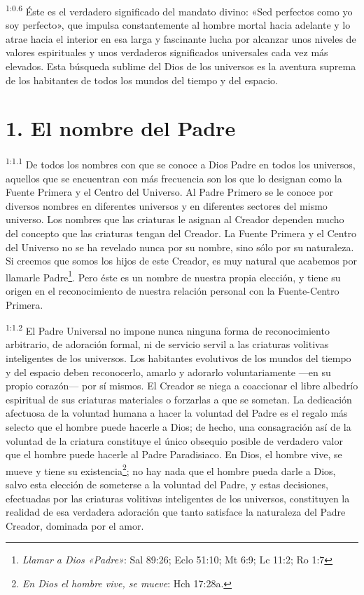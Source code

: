 \par
\textsuperscript{1:0.6} Éste es el verdadero significado del mandato divino: «Sed perfectos como yo soy perfecto», que impulsa constantemente al hombre mortal hacia adelante y lo atrae hacia el interior en esa larga y fascinante lucha por alcanzar unos niveles de valores espirituales y unos verdaderos significados universales cada vez más elevados. Esta búsqueda sublime del Dios de los universos es la aventura suprema de los habitantes de todos los mundos del tiempo y del espacio.

\section*{1. El nombre del Padre}
\par
\textsuperscript{1:1.1} De todos los nombres con que se conoce a Dios Padre en todos los universos, aquellos que se encuentran con más frecuencia son los que lo designan como la Fuente Primera y el Centro del Universo. Al Padre Primero se le conoce por diversos nombres en diferentes universos y en diferentes sectores del mismo universo. Los nombres que las criaturas le asignan al Creador dependen mucho del concepto que las criaturas tengan del Creador. La Fuente Primera y el Centro del Universo no se ha revelado nunca por su nombre, sino sólo por su naturaleza. Si creemos que somos los hijos de este Creador, es muy natural que acabemos por llamarle Padre\footnote{\textit{Llamar a Dios «Padre»}: Sal 89:26; Eclo 51:10; Mt 6:9; Lc 11:2; Ro 1:7}. Pero éste es un nombre de nuestra propia elección, y tiene su origen en el reconocimiento de nuestra relación personal con la Fuente-Centro Primera.

\par
\textsuperscript{1:1.2} El Padre Universal no impone nunca ninguna forma de reconocimiento arbitrario, de adoración formal, ni de servicio servil a las criaturas volitivas inteligentes de los universos. Los habitantes evolutivos de los mundos del tiempo y del espacio deben reconocerlo, amarlo y adorarlo voluntariamente ---en su propio corazón--- por sí mismos. El Creador se niega a coaccionar el libre albedrío espiritual de sus criaturas materiales o forzarlas a que se sometan. La dedicación afectuosa de la voluntad humana a hacer la voluntad del Padre es el regalo más selecto que el hombre puede hacerle a Dios; de hecho, una consagración así de la voluntad de la criatura constituye el único obsequio posible de verdadero valor que el hombre puede hacerle al Padre Paradisiaco. En Dios, el hombre vive, se mueve y tiene su existencia\footnote{\textit{En Dios el hombre vive, se mueve}: Hch 17:28a.}; no hay nada que el hombre pueda darle a Dios, salvo esta elección de someterse a la voluntad del Padre, y estas decisiones, efectuadas por las criaturas volitivas inteligentes de los universos, constituyen la realidad de esa verdadera adoración que tanto satisface la naturaleza del Padre Creador, dominada por el amor.

